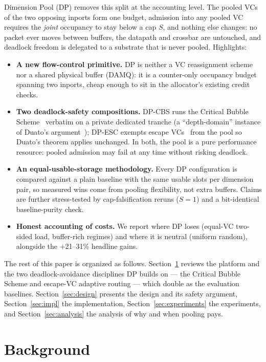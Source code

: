 \documentclass[10pt]{article}
\begin{document}
Dimension Pool (DP) removes this split at the accounting level. The
pooled VCs of the two opposing inports form one budget, admission into any
pooled VC requires the \emph{joint} occupancy to stay below a cap $S$, and
nothing else changes: no packet ever moves between buffers, the datapath
and crossbar are untouched, and deadlock freedom is delegated to a
substrate that is never pooled. Highlights:

\begin{itemize}
  \item \textbf{A new flow-control primitive.} DP is neither a VC
    reassignment scheme nor a shared physical buffer (DAMQ): it is a
    counter-only occupancy budget spanning two inports, cheap enough to
    sit in the allocator's existing credit checks.
  \item \textbf{Two deadlock-safety compositions.} DP-CBS runs the
    Critical Bubble Scheme~\cite{chen2011} verbatim on a private
    dedicated tranche (a ``depth-domain'' instance of Duato's
    argument~\cite{duato1993}); DP-ESC exempts escape
    VCs~\cite{dally1987,duato1993} from the pool so Duato's theorem
    applies unchanged. In both, the pool is a pure performance resource:
    pooled admission may fail at any time without risking deadlock.
  \item \textbf{An equal-usable-storage methodology.} Every DP
    configuration is compared against a plain baseline with the same
    usable slots per dimension pair, so measured wins come from pooling
    flexibility, not extra buffers. Claims are further stress-tested by
    cap-falsification reruns ($S{=}1$) and a bit-identical baseline-purity
    check.
  \item \textbf{Honest accounting of costs.} We report where DP loses
    (equal-VC two-sided load, buffer-rich regimes) and where it is
    neutral (uniform random), alongside the +21--31\% headline gains.
\end{itemize}

The rest of this paper is organized as follows.
Section~\ref{sec:background} reviews the platform and the two
deadlock-avoidance disciplines DP builds on --- the Critical Bubble
Scheme and escape-VC adaptive routing --- which double as the
evaluation baselines. Section~\ref{sec:design} presents the design and
its safety argument, Section~\ref{sec:impl} the implementation,
Section~\ref{sec:experiments} the experiments, and
Section~\ref{sec:analysis} the analysis of why and when pooling pays.

\section{Background}
\label{sec:background}
\end{document}

